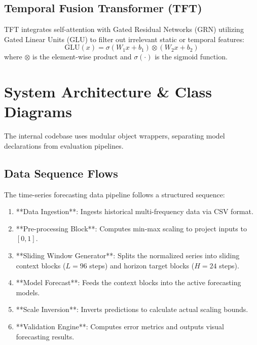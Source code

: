 \documentclass[11pt,journal,onecolumn]{IEEEtran}
\begin{document}
\subsection{Temporal Fusion Transformer (TFT)}
TFT integrates self-attention with Gated Residual Networks (GRN) utilizing Gated Linear Units (GLU) to filter out irrelevant static or temporal features:
\begin{equation}
\text{GLU}(x) = \sigma(W_1 x + b_1) \otimes (W_2 x + b_2)
\end{equation}
where $\otimes$ is the element-wise product and $\sigma(\cdot)$ is the sigmoid function.

\section{System Architecture \& Class Diagrams}
The internal codebase uses modular object wrappers, separating model declarations from evaluation pipelines.

\subsection{Data Sequence Flows}
The time-series forecasting data pipeline follows a structured sequence:
\begin{enumerate}
    \item **Data Ingestion**: Ingests historical multi-frequency data via CSV format.
    \item **Pre-processing Block**: Computes min-max scaling to project inputs to $[0, 1]$.
    \item **Sliding Window Generator**: Splits the normalized series into sliding context blocks ($L = 96$ steps) and horizon target blocks ($H = 24$ steps).
    \item **Model Forecast**: Feeds the context blocks into the active forecasting models.
    \item **Scale Inversion**: Inverts predictions to calculate actual scaling bounds.
    \item **Validation Engine**: Computes error metrics and outputs visual forecasting results.
\end{enumerate}
\end{document}
